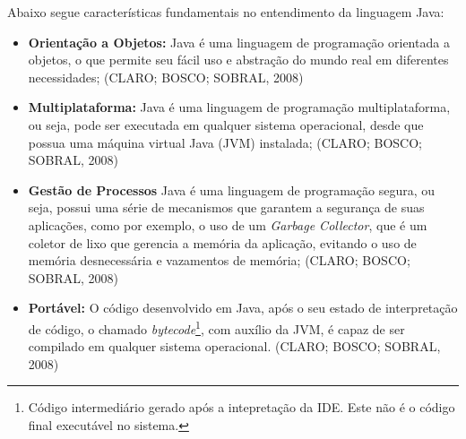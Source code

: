 \documentclass[a4paper,12pt]{article}
\begin{document}
Abaixo segue características fundamentais no entendimento da linguagem Java:
\begin{itemize}
	\item \textbf{Orientação a Objetos:} Java é uma linguagem de programação orientada a objetos, o que permite seu fácil uso e abstração do mundo real em diferentes necessidades; (CLARO; BOSCO; SOBRAL, 2008)
	\item \textbf{Multiplataforma:} Java é uma linguagem de programação multiplataforma, ou seja, pode ser executada em qualquer sistema operacional, desde que possua uma máquina virtual Java (JVM) instalada; (CLARO; BOSCO; SOBRAL, 2008)
	\item \textbf{Gestão de Processos} Java é uma linguagem de programação segura, ou seja, possui uma série de mecanismos que garantem a segurança de suas aplicações, como por exemplo, o uso de um \textit{Garbage Collector}, 
	que é um coletor de lixo que gerencia a memória da aplicação, evitando o uso de memória desnecessária e vazamentos de memória; (CLARO; BOSCO; SOBRAL, 2008)
	\item \textbf{Portável:} O código desenvolvido em Java, após o seu estado de interpretação de código, o chamado \textit{bytecode}\footnote{
		Código intermediário gerado após a intepretação da IDE. Este não é o código final executável no sistema.
	}, com auxílio da JVM, é capaz de ser compilado em qualquer sistema operacional. (CLARO; BOSCO; SOBRAL, 2008)
\end{itemize}
\end{document}
